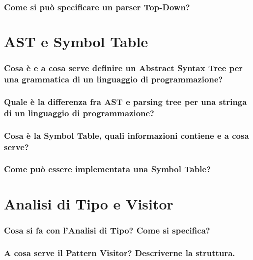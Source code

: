 \documentclass[11pt]{article}
\begin{document}
\subsubsection*{Come si può specificare un parser Top-Down?}

\section*{AST e Symbol Table}
\subsubsection*{Cosa è e a cosa serve definire un Abstract Syntax Tree per una grammatica di un linguaggio di programmazione?}

\subsubsection*{Quale è la differenza fra AST e parsing tree per una stringa di un linguaggio di programmazione?}

\subsubsection*{Cosa è la Symbol Table, quali informazioni contiene e a cosa serve?}

\subsubsection*{Come può essere implementata una Symbol Table?}

\section*{Analisi di Tipo e Visitor}
\subsubsection*{Cosa si fa con l'Analisi di Tipo? Come si specifica?}

\subsubsection*{A cosa serve il Pattern Visitor? Descriverne la struttura.}
\end{document}
